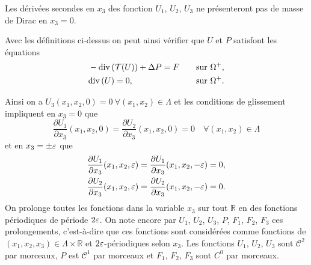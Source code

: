 Les dérivées secondes en $x_3$ des fonction $U_1$, $U_2$, $U_3$ ne
présenteront pas de masse de Dirac en $x_3 = 0$.

Avec les définitions ci-dessus on peut ainsi vérifier que $U$ et $P$
satisfont les équations
\begin{align}
  &-\mathrm{div}\left( \mathcal T(U) \right) + \Delta P = F& \quad \text{sur }\Omega^+,\\
  &\mathrm{div}\left( U \right) = 0,& \quad \text{sur }\Omega^+.
\end{align}


Ainsi on a $U_3(x_1, x_2, 0) = 0\ \forall(x_1, x_2)\in\Lambda$ et les
conditions de glissement impliquent en $x_3 = 0$ que
\begin{equation}
  \frac{\partial
U_1}{\partial x_3}(x_1,x_2, 0) = \frac{\partial U_2}{\partial
  x_3}(x_1, x_2, 0) = 0\quad \forall (x_1, x_2) \in \Lambda
\end{equation}
et en $x_3 = \pm\varepsilon$ que
\begin{align}
  &\frac{\partial U_1}{\partial x_3}(x_1, x_2, \varepsilon) = \frac{\partial U_1}{\partial x_3}(x_1, x_2, -\varepsilon) = 0,\\
  &\frac{\partial U_2}{\partial x_3}(x_1, x_2, \varepsilon) = \frac{\partial U_2}{\partial x_3}(x_1, x_2, -\varepsilon) = 0.
\end{align}
On prolonge toutes les fonctions dans la variable $x_3$ sur tout
$\mathbb R$ en des fonctions périodiques de période $2\varepsilon$. On
note encore par $U_1$, $U_2$, $U_3$, $P$, $F_1$, $F_2$, $F_3$ ces
prolongements, c'est-à-dire que ces fonctions sont considérées comme
fonctions de $(x_1, x_2, x_3)\in \Lambda\times \mathbb R$ et
$2\varepsilon$-périodiques selon $x_3$. Les fonctions $U_1$, $U_2$,
$U_3$ sont $\mathcal C^2$ par morceaux, $P$ est $\mathcal C^1$ par
morceaux et $F_1$, $F_2$, $F_3$ sont $C^0$ par morceaux.

